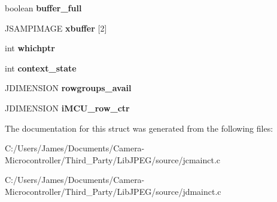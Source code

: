 \begin{DoxyCompactItemize}
boolean {\bfseries buffer\+\_\+full}
\item 
\mbox{\label{structmy__main__controller_a9fa92292967c7e97d6d72623d63261df}} 
J\+S\+A\+M\+P\+I\+M\+A\+GE {\bfseries xbuffer} \mbox{[}2\mbox{]}
\item 
\mbox{\label{structmy__main__controller_ace72d3f083a12ad58d4b34dc2ea71d9d}} 
int {\bfseries whichptr}
\item 
\mbox{\label{structmy__main__controller_a6b97be2d98ab42779840d26cd8024aa8}} 
int {\bfseries context\+\_\+state}
\item 
\mbox{\label{structmy__main__controller_a1df1dd193bd0e8fe265438bd5ad48e67}} 
J\+D\+I\+M\+E\+N\+S\+I\+ON {\bfseries rowgroups\+\_\+avail}
\item 
\mbox{\label{structmy__main__controller_ad7fc3a6b7d89af923d201c8eeced3355}} 
J\+D\+I\+M\+E\+N\+S\+I\+ON {\bfseries i\+M\+C\+U\+\_\+row\+\_\+ctr}
\end{DoxyCompactItemize}


The documentation for this struct was generated from the following files\+:\begin{DoxyCompactItemize}
\item 
C\+:/\+Users/\+James/\+Documents/\+Camera-\/\+Microcontroller/\+Third\+\_\+\+Party/\+Lib\+J\+P\+E\+G/source/jcmainct.\+c\item 
C\+:/\+Users/\+James/\+Documents/\+Camera-\/\+Microcontroller/\+Third\+\_\+\+Party/\+Lib\+J\+P\+E\+G/source/jdmainct.\+c\end{DoxyCompactItemize}
